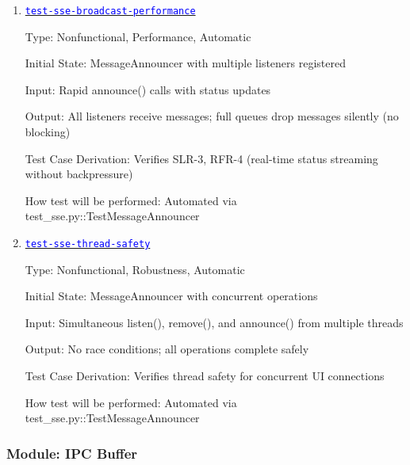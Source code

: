 \documentclass[12pt, titlepage]{article}
\newcommand{\tid}[1]{\hyperlink{tid:#1}{\textcolor{blue}{\texttt{#1}}}}
\begin{document}
\begin{enumerate}

  \item{\tid{test-sse-broadcast-performance}\\}

        Type: Nonfunctional, Performance, Automatic

        Initial State: MessageAnnouncer with multiple listeners registered

        Input: Rapid announce() calls with status updates

        Output: All listeners receive messages; full queues drop messages silently (no
        blocking)

        Test Case Derivation: Verifies SLR-3, RFR-4 (real-time status streaming without
        backpressure)

        How test will be performed: Automated via test\_sse.py::TestMessageAnnouncer

  \item{\tid{test-sse-thread-safety}\\}

        Type: Nonfunctional, Robustness, Automatic

        Initial State: MessageAnnouncer with concurrent operations

        Input: Simultaneous listen(), remove(), and announce() from multiple threads

        Output: No race conditions; all operations complete safely

        Test Case Derivation: Verifies thread safety for concurrent UI connections

        How test will be performed: Automated via test\_sse.py::TestMessageAnnouncer

\end{enumerate}

\subsubsection{Module: IPC Buffer}
\end{document}
